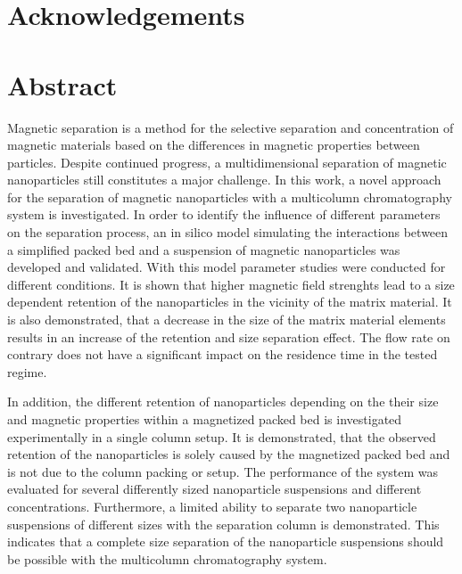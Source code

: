 \chapter{Acknowledgements}
\label{ch:Acknowledgements}


\newpage

\chapter{Abstract}
\label{ch:abstract_en}

Magnetic separation is a method for the selective separation and concentration of magnetic materials based on the differences in magnetic properties between particles. Despite continued progress, a multidimensional separation of magnetic nanoparticles still constitutes a major challenge. In this work, a novel approach for the separation of magnetic nanoparticles with a multicolumn chromatography system is investigated. In order to identify the influence of different parameters on the separation process, an in silico model simulating the interactions between a simplified packed bed and a suspension of magnetic nanoparticles was developed and validated. With this model parameter studies were conducted for different conditions. It is shown that higher magnetic field strenghts lead to a size dependent retention of the nanoparticles in the vicinity of the matrix material. It is also demonstrated, that a decrease in the size of the matrix material elements results in an increase of the retention and size separation effect. The flow rate on contrary does not have a significant impact on the residence time in the tested regime.  

In addition, the different retention of nanoparticles depending on the their size and magnetic properties within a magnetized packed bed is investigated experimentally in a single column setup. It is demonstrated, that the observed retention of the nanoparticles is solely caused by the magnetized packed bed and is not due to the column packing or setup. The performance of the system was evaluated for several differently sized nanoparticle suspensions and different concentrations. Furthermore, a limited ability to separate two nanoparticle suspensions of different sizes with the separation column is demonstrated. This indicates that a complete size separation of the nanoparticle suspensions should be possible with the multicolumn chromatography system. 
